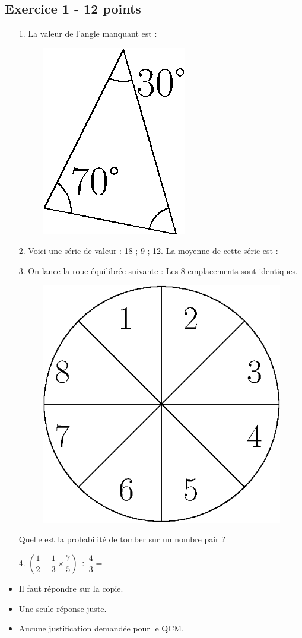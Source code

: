 \newpage \strut \newpage

\subsection*{Exercice 1 - 12 points}

\medskip

\begin{multicols}{2}

    \begin{enumerate}
        \item[1.] La valeur de l’angle manquant est :
        \begin{figure}[H]
            \centering
            \includegraphics[width=0.2\linewidth]{qcm1.eps}
        \end{figure}

        \item[2.] Voici une série de valeur : 18 ; 9 ; 12. \newline 
        La moyenne de cette série est : 

        \item[3.] On lance la roue équilibrée suivante : \newline 
        Les 8 emplacements sont identiques.
        \begin{figure}[H]
            \centering
            \includegraphics[width=0.2\linewidth]{qcm3.eps}
        \end{figure}
        Quelle est la probabilité de tomber sur un nombre pair ? 
        \item[4.] $\left( \dfrac{1}{2} - \dfrac{1}{3} \times \dfrac{7}{5} \right) \div \dfrac{4}{3} = $
    \end{enumerate} \columnbreak
    
    \begin{itemize}[label={$\bullet$}]
        \item Il faut répondre sur la copie. 
        \item Une seule réponse juste.
        \item Aucune justification demandée pour le QCM.
    \end{itemize}


\end{multicols}
